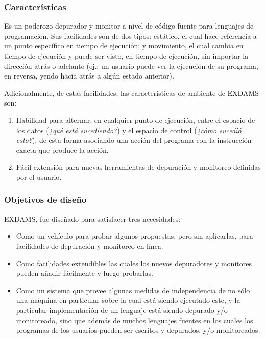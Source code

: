 \documentclass[12pt,legalpaper]{report}
\begin{document}
			\subsubsection{Características}

Es un poderozo depurador y monitor a nivel de código fuente para lenguajes de programación.  Sus facilidades son de dos tipos: estático, el cual hace referencia a un punto específico en tiempo de ejecución; y movimiento, el cual cambia en tiempo de ejecución y puede ser visto, en tiempo de ejecución, sin importar la dirección atrás o adelante (ej.: un usuario puede ver la ejecución de su programa, en reversa, yendo hacía atrás a algún estado anterior).

Adicionalmente, de estas facilidades, las características de ambiente de EXDAMS son:
\begin{enumerate}
	\item Habilidad para alternar, en cualquier punto de ejecución, entre el espacio de los datos (\textit{¿qué está sucediendo?}) y el espacio de control (\textit{¿cómo sucedió esto?}), de esta forma asociando una acción del programa con la instrucción exacta que produce la acción.

	\item Fácil extensión para nuevas herramientas de depuración y monitoreo definidas por el usuario.
\end{enumerate} 

			\subsubsection{Objetivos de diseño}

EXDAMS, fue diseñado para satisfacer tres necesidades:
\begin{itemize}
	\item Como un vehículo para probar algunos propuestas, pero sin aplicarlas, para facilidades de depuración y monitoreo en línea.

	\item Como facilidades extendibles las cuales los nuevos depuradores y monitores pueden añadir fácilmente y luego probarlas.

	\item Como un sistema que provee algunas medidas de independencia de no sólo una máquina en particular sobre la cual está siendo ejecutado este, y la particular implementación de un lenguaje está siendo depurado y/o monitoreado, sino que además de muchos lenguajes fuentes en los cuales los programas de los usuarios pueden ser escritos y depurados, y/o monitoreados.
\end{itemize}
\end{document}

